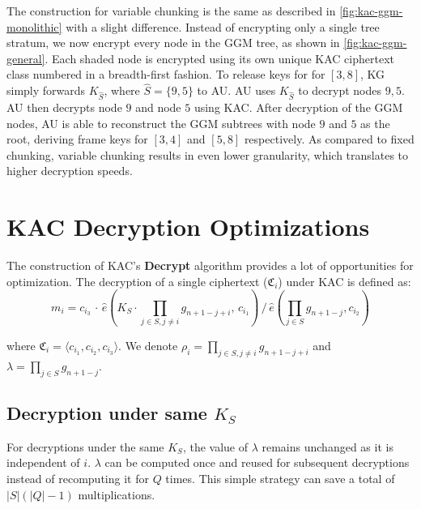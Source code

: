 \documentclass[hyp,a4paper,12pt,openbib]{socreport}
\begin{document}
The construction for variable chunking is the same as described in \cref{fig:kac-ggm-monolithic} with a slight difference. Instead of encrypting only a single tree stratum, we now encrypt every node in the GGM tree, as shown in \cref{fig:kac-ggm-general}. Each shaded node is encrypted using its own unique KAC ciphertext class numbered in a breadth-first fashion. To release keys for for $[3,8]$, KG simply forwards $K_{\hat{S}}$, where $\hat{S}=\{9, 5\}$ to AU. AU uses $K_{\hat{S}}$ to decrypt nodes $9,5$. AU then decrypts node $9$ and node $5$ using KAC. After decryption of the GGM nodes, AU is able to reconstruct the GGM subtrees with node $9$ and $5$ as the root, deriving frame keys for $[3,4]$ and $[5,8]$ respectively. As compared to fixed chunking, variable chunking results in even lower granularity, which translates to higher decryption speeds.



\section{KAC Decryption Optimizations}

\label{sec:kac-range-decryption}

The construction of KAC's \textbf{Decrypt} algorithm provides a lot of opportunities for optimization. The decryption of a single ciphertext ($\mathfrak{C}_i$) under KAC is defined as:
\[
m_i = c_{i_3}  \, \cdot \,  \hat{e}(K_S \cdot   \prod_{j \in S, j \neq i} g_{n+1-j+i}, \, c_{i_1}) \, / \,  \hat{e}(  \prod_{j \in S} g_{n+1-j}, c_{i_2}) 
\]


where $\mathfrak{C}_i = \langle c_{i_1}, c_{i_2}, c_{i_3} \rangle$. We denote $\displaystyle \rho_{i}=\prod_{j \in S, j \neq i} g_{n+1-j+i}$ and $\displaystyle \lambda = \prod_{j \in S} g_{n+1-j}$. 

\subsection{Decryption under same $K_S$}

For decryptions under the same $K_S$, the value of $\lambda$ remains unchanged as it is independent of $i$. $\lambda$ can be computed once and reused for subsequent decryptions instead of recomputing it for $Q$ times. This simple strategy can save a total of $|S|(|Q|-1)$ multiplications.

\end{document}
